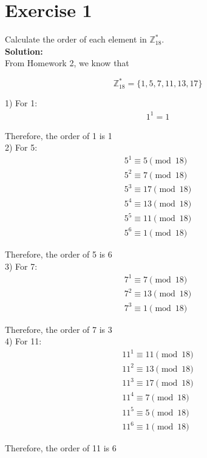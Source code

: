 \documentclass{article}
\begin{document}
\section*{Exercise 1}
Calculate the order of each element in $\mathbb{Z}_{18}^*$. \\

\textbf{Solution:} \\

From Homework 2, we know that

$$\mathbb{Z}_{18}^* = \{1, 5, 7, 11, 13, 17\}$$

1) For 1:
\begin{align*}
   1^1 = 1
\end{align*}

Therefore, the order of 1 is 1 \\

2) For 5:
\begin{align*}
   5^1 \equiv 5 \pmod{18} \\
   5^2 \equiv 7 \pmod{18} \\
   5^3 \equiv 17 \pmod{18} \\
   5^4 \equiv 13 \pmod{18} \\
   5^5 \equiv 11 \pmod{18} \\
   5^6 \equiv 1 \pmod{18}
\end{align*}

Therefore, the order of 5 is 6 \\

3) For 7:
\begin{align*}
   7^1 \equiv 7 \pmod{18} \\
   7^2 \equiv 13 \pmod{18} \\
   7^3 \equiv 1 \pmod{18}
\end{align*}

Therefore, the order of 7 is 3 \\

4) For 11:
\begin{align*}
   11^1 \equiv 11 \pmod{18} \\
   11^2 \equiv 13 \pmod{18} \\
   11^3 \equiv 17 \pmod{18} \\
   11^4 \equiv 7 \pmod{18} \\
   11^5 \equiv 5 \pmod{18} \\
   11^6 \equiv 1 \pmod{18}
\end{align*}

Therefore, the order of 11 is 6 \\
\end{document}

